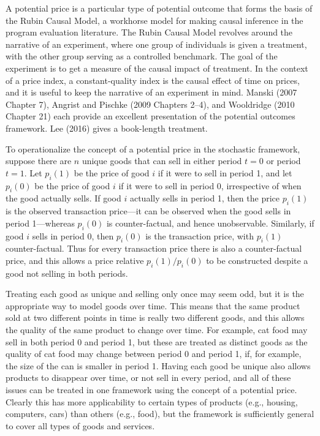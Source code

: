 \documentclass[]{article}
\begin{document}
A potential price is a particular type of potential outcome that forms the basis of the Rubin Causal Model, a workhorse model for making causal inference in the program evaluation literature. The Rubin Causal Model revolves around the narrative of an experiment, where one group of individuals is given a treatment, with the other group serving as a controlled benchmark. The goal of the experiment is to get a measure of the causal impact of treatment. In the context of a price index, a constant-quality index is the causal effect of time on prices, and it is useful to keep the narrative of an experiment in mind. Manski (2007 Chapter 7), Angrist and Pischke (2009 Chapters 2--4), and Wooldridge (2010 Chapter 21) each provide an excellent presentation of the potential outcomes framework. Lee (2016) gives a book-length treatment.

To operationalize the concept of a potential price in the stochastic framework, suppose there are \(n\) unique goods that can sell in either period \(t = 0\) or period \(t = 1\). Let \(p_{i}(1)\) be the price of good \(i\) if it were to sell in period 1, and let \(p_{i}(0)\) be the price of good \(i\) if it were to sell in period 0, irrespective of when the good actually sells. If good \(i\) actually sells in period 1, then the price \(p_{i}(1)\) is the observed transaction price---it can be observed when the good sells in period 1---whereas \(p_{i}(0)\) is counter-factual, and hence unobservable. Similarly, if good \(i\) sells in period 0, then \(p_{i}(0)\) is the transaction price, with \(p_{i}(1)\) counter-factual. Thus for every transaction price there is also a counter-factual price, and this allows a price relative \(p_{i}(1) / p_{i}(0)\) to be constructed despite a good not selling in both periods.

Treating each good as unique and selling only once may seem odd, but it is the appropriate way to model goods over time. This means that the same product sold at two different points in time is really two different goods, and this allows the quality of the same product to change over time. For example, cat food may sell in both period 0 and period 1, but these are treated as distinct goods as the quality of cat food may change between period 0 and period 1, if, for example, the size of the can is smaller in period 1. Having each good be unique also allows products to disappear over time, or not sell in every period, and all of these issues can be treated in one framework using the concept of a potential price. Clearly this has more applicability to certain types of products (e.g., housing, computers, cars) than others (e.g., food), but the framework is sufficiently general to cover all types of goods and services.
\end{document}
